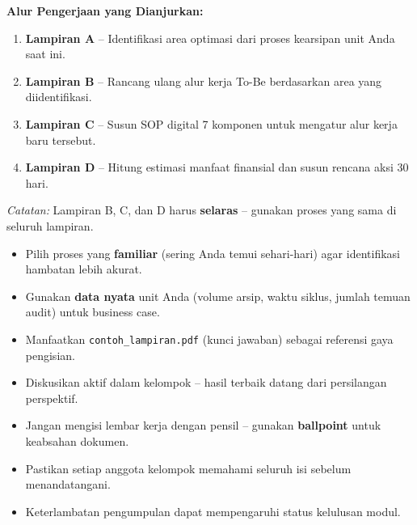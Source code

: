 \documentclass[12pt,a4paper]{report}
\begin{document}
\vspace{0.4cm}

\begin{instruksibox}
\textbf{Alur Pengerjaan yang Dianjurkan:}
\begin{enumerate}
    \item \textbf{Lampiran A} -- Identifikasi area optimasi dari proses kearsipan unit Anda saat ini.
    \item \textbf{Lampiran B} -- Rancang ulang alur kerja To-Be berdasarkan area yang diidentifikasi.
    \item \textbf{Lampiran C} -- Susun SOP digital 7 komponen untuk mengatur alur kerja baru tersebut.
    \item \textbf{Lampiran D} -- Hitung estimasi manfaat finansial dan susun rencana aksi 30 hari.
\end{enumerate}
\textit{Catatan:} Lampiran B, C, dan D harus \textbf{selaras} -- gunakan proses yang sama di seluruh lampiran.
\end{instruksibox}

\vspace{0.3cm}

\begin{tipbox}
\begin{itemize}
    \item Pilih proses yang \textbf{ familiar} (sering Anda temui sehari-hari) agar identifikasi hambatan lebih akurat.
    \item Gunakan \textbf{data nyata} unit Anda (volume arsip, waktu siklus, jumlah temuan audit) untuk business case.
    \item Manfaatkan \texttt{contoh\_lampiran.pdf} (kunci jawaban) sebagai referensi gaya pengisian.
    \item Diskusikan aktif dalam kelompok -- hasil terbaik datang dari persilangan perspektif.
\end{itemize}
\end{tipbox}

\vspace{0.3cm}

\begin{warnbox}
\begin{itemize}
    \item Jangan mengisi lembar kerja dengan pensil -- gunakan \textbf{ballpoint} untuk keabsahan dokumen.
    \item Pastikan setiap anggota kelompok memahami seluruh isi sebelum menandatangani.
    \item Keterlambatan pengumpulan dapat mempengaruhi status kelulusan modul.
\end{itemize}
\end{warnbox}
\end{document}
